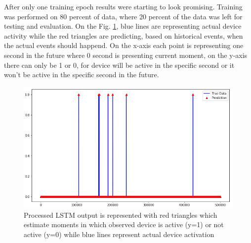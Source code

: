 \documentclass[11pt, a4paper]{article} %
\begin{document}
After only one training epoch results were starting to look promising. 
Training was performed on 80 percent of data, where 20 percent of the data was left for testing and evaluation.
On the Fig. \ref{lstm-out}, blue lines are representing actual device activity while the red triangles are predicting, based on historical events, when the actual events should happend. 
On the x-axis each point is representing one second in the future where 0 second is presenting current moment, on the y-axis there can only be 1 or 0, for device will be active in the specific second or it won't be active in the specific second in the future.
\begin{figure}
	\centering
	\includegraphics[scale=.6]{images/lstm-out.png} %
	\caption{Processed LSTM output is represented with red triangles which estimate moments in which observed device is active (y=1) or not active (y=0) while blue lines represent actual device activation }
	\label{lstm-out} 
\end{figure}
\end{document}
